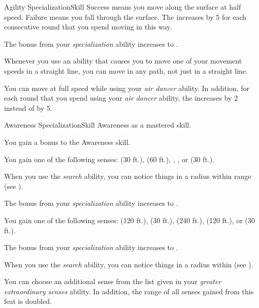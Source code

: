 \begin{feat}{Agility Specialization}{Skill}
        Success means you move along the surface at half speed.
        Failure means you fall through the surface.
        The  increases by 5 for each consecutive round that you spend moving in this way.

         The bonus from your \textit{specialization} ability increases to .

         Whenever you use an ability that causes you to move one of your movement speeds in a straight line, you can move in any path, not just in a straight line.

         You can move at full speed while using your \textit{air dancer} ability.
        In addition, for each round that you spend using your \textit{air dancer} ability, the  increases by 2 instead of by 5.
    \end{feat}

    \begin{feat}{Awareness Specialization}{Skill}
        \featpre Awareness as a mastered skill.

         You gain a  bonus to the Awareness skill.

         You gain one of the following senses:  (30 ft.),  (60 ft.), , , or  (30 ft.).

         When you use the \textit{search} ability, you can notice things in a \areasmall radius within \rngshort range (see ).

         The bonus from your \textit{specialization} ability increases to .

         You gain one of the following senses:  (120 ft.),  (30 ft.),  (240 ft.),  (120 ft.), or  (30 ft.).

         The bonus from your \textit{specialization} ability increases to .

         When you use the \textit{search} ability, you can notice things in a \medarea radius within \medrange (see ).

         You can choose an additional sense from the list given in your \textit{greater extraordinary senses} ability.
        In addition, the range of all senses gained from this feat is doubled.
    \end{feat}

